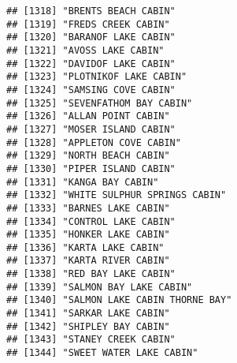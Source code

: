 \documentclass[
]{article}
\begin{document}
\begin{verbatim}
## [1318] "BRENTS BEACH CABIN"                                                                  
## [1319] "FREDS CREEK CABIN"                                                                   
## [1320] "BARANOF LAKE CABIN"                                                                  
## [1321] "AVOSS LAKE CABIN"                                                                    
## [1322] "DAVIDOF LAKE CABIN"                                                                  
## [1323] "PLOTNIKOF LAKE CABIN"                                                                
## [1324] "SAMSING COVE CABIN"                                                                  
## [1325] "SEVENFATHOM BAY CABIN"                                                               
## [1326] "ALLAN POINT CABIN"                                                                   
## [1327] "MOSER ISLAND CABIN"                                                                  
## [1328] "APPLETON COVE CABIN"                                                                 
## [1329] "NORTH BEACH CABIN"                                                                   
## [1330] "PIPER ISLAND CABIN"                                                                  
## [1331] "KANGA BAY CABIN"                                                                     
## [1332] "WHITE SULPHUR SPRINGS CABIN"                                                         
## [1333] "BARNES LAKE CABIN"                                                                   
## [1334] "CONTROL LAKE CABIN"                                                                  
## [1335] "HONKER LAKE CABIN"                                                                   
## [1336] "KARTA LAKE CABIN"                                                                    
## [1337] "KARTA RIVER CABIN"                                                                   
## [1338] "RED BAY LAKE CABIN"                                                                  
## [1339] "SALMON BAY LAKE CABIN"                                                               
## [1340] "SALMON LAKE CABIN THORNE BAY"                                                        
## [1341] "SARKAR LAKE CABIN"                                                                   
## [1342] "SHIPLEY BAY CABIN"                                                                   
## [1343] "STANEY CREEK CABIN"                                                                  
## [1344] "SWEET WATER LAKE CABIN"                                                              

\end{verbatim}
\end{document}
